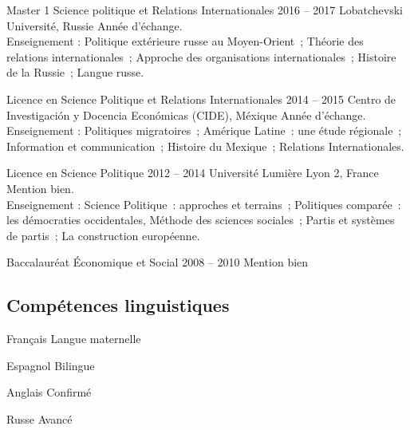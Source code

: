 \documentclass[30pt, french]{tccv}
\begin{document}
\begin{upshape}
\begin{education}
\vspace{0.5cm}
\item[Master 1 Science politique et Relations Internationales]{2016 -- 2017}
     {Lobatchevski Université, Russie}
     {     
     Année d’échange.\\
     \sloppy
     Enseignement : Politique extérieure russe au Moyen-Orient ; 
     Théorie des relations internationales ; 
     Approche des organisations internationales ; 
     Histoire de la Russie ; 
     Langue russe.
     }
     
   


\vspace{0.5cm}
\item[Licence en Science Politique et Relations Internationales]{2014 -- 2015}
     {Centro de Investigación y Docencia Económicas (CIDE), Méxique}
     {Année d’échange.\\
     Enseignement : Politiques migratoires ; Amérique Latine : une étude régionale ; Information et communication ; Histoire du Mexique ; Relations Internationales.
     }

     
\vspace{0.5cm}    
\item[Licence en Science Politique ]{2012 -- 2014}
     {Université Lumière Lyon 2, France}
     {Mention bien.\\
     Enseignement : Science Politique : approches et terrains ; Politiques comparée : les démocraties occidentales, Méthode des sciences sociales ; Partis et systèmes de partis ; La construction européenne. 
     }

     
\vspace{0.5cm}
\item[Baccalauréat Économique et Social]{2008 -- 2010}
     {}
     {Mention bien}


\end{education}


%
%


\begin{competence}


\section{Compétences linguistiques}
\fontsize{15pt}{1.6em}\color{text}\bodyfontlight\upshape\selectfont %
\begin{factlist}
\item{Français} {Langue maternelle}	
\item{Espagnol} {Bilingue}	
\item{Anglais} {Confirmé}	
\item{Russe} {Avancé}
\end{factlist}


\end{competence}
\end{upshape}
\end{document}
